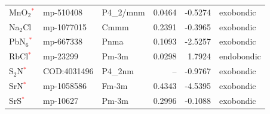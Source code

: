 \begin{longtable}{@{}lllrrl@{}}
MnO$_{2}$\textcolor{red}{$^*$} & mp-510408 & P4\_2/mnm & 0.0464 & -0.5274 & exobondic \\
Na$_{2}$Cl & mp-1077015 & Cmmm & 0.2391 & -0.3965 & exobondic \\
PbN$_{6}$\textcolor{red}{$^*$} & mp-667338 & Pnma & 0.1093 & -2.5257 & exobondic \\
RbCl\textcolor{red}{$^*$} & mp-23299 & Pm-3m & 0.0298 & 1.7924 & endobondic \\
S$_{2}$N\textcolor{red}{$^*$} & COD:4031496 & P4\_2nm & -- & -0.9767 & exobondic \\
SrN\textcolor{red}{$^*$} & mp-1058586 & Fm-3m & 0.4343 & -4.5395 & exobondic \\
SrS\textcolor{red}{$^*$} & mp-10627 & Pm-3m & 0.2996 & -0.1088 & exobondic \\
\end{longtable}

